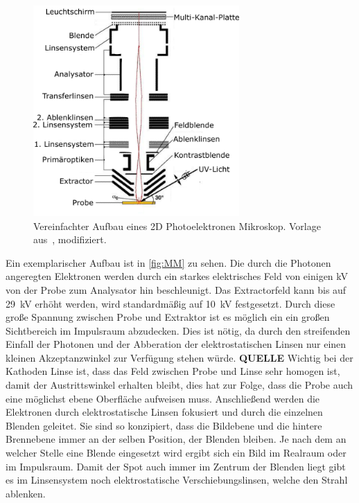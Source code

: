         \begin{figure}
            \centering
            \includegraphics[width=0.7\textwidth]{./content/PEEM_schemaneu.png}
            \caption{Vereinfachter Aufbau eines 2D Photoelektronen Mikroskop. Vorlage aus~\cite{KUCH}, modifiziert.}
            \label{fig:MM}
        \end{figure}
        Ein exemplarischer Aufbau ist in \autoref{fig:MM} zu sehen.
        Die durch die Photonen angeregten Elektronen werden durch ein starkes elektrisches Feld von einigen \si{\kilo\volt} von der Probe zum Analysator hin beschleunigt.
        Das Extractorfeld kann bis auf \SI{29}{\kilo\volt} erhöht werden, wird standardmäßig auf \SI{10}{\kilo\volt} festgesetzt.
        Durch diese große Spannung zwischen Probe und Extraktor ist es möglich ein ein großen Sichtbereich im Impulsraum abzudecken.
        Dies ist nötig, da durch den streifenden Einfall der Photonen und der Abberation der elektrostatischen Linsen nur einen kleinen Akzeptanzwinkel zur Verfügung stehen würde. \textbf{QUELLE}
        Wichtig bei der Kathoden Linse ist, dass das Feld zwischen Probe und Linse sehr homogen ist, damit der Austrittswinkel erhalten bleibt, dies hat zur Folge, dass die Probe auch eine möglichst ebene Oberfläche aufweisen muss.
        Anschließend werden die Elektronen durch elektrostatische Linsen fokusiert und durch die einzelnen Blenden geleitet.
        Sie sind so konzipiert, dass die Bildebene und die hintere Brennebene immer an der selben Position, der Blenden bleiben.
        Je nach dem an welcher Stelle eine Blende eingesetzt wird ergibt sich ein Bild im Realraum oder im Impulsraum.
        Damit der Spot auch immer im Zentrum der Blenden liegt gibt es im Linsensystem noch elektrostatische Verschiebungslinsen, welche den Strahl ablenken.
